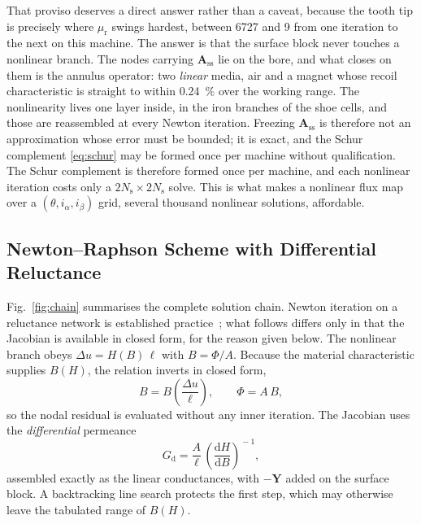 \documentclass[10pt,a4paper,twocolumn]{article}
\theoremstyle{plain}
\theoremstyle{remark}
\begin{document}
That proviso deserves a direct answer rather than a caveat, because the
tooth tip is precisely where $\mu_{\mathrm{r}}$ swings hardest, between
\num{6727} and \num{9} from one iteration to the next on this machine.
The answer is that the surface block never touches a nonlinear branch.
The nodes carrying $\bm{A}_{\mathrm{ss}}$ lie on the bore, and what
closes on them is the annulus operator: two \emph{linear} media, air and
a magnet whose recoil characteristic is straight to within
\SI{0.24}{\percent} over the working range. The nonlinearity lives one
layer inside, in the iron branches of the shoe cells, and those are
reassembled at every Newton iteration. Freezing $\bm{A}_{\mathrm{ss}}$
is therefore not an approximation whose error must be bounded; it is
exact, and the Schur complement \eqref{eq:schur} may be formed once per
machine without qualification. The Schur
complement is therefore formed once per machine, and each nonlinear
iteration costs only a $2N_{\mathrm{s}}\times 2N_{\mathrm{s}}$ solve.
This is what makes a nonlinear flux map over a
$(\theta,i_\alpha,i_\beta)$ grid, several thousand nonlinear
solutions, affordable.

\subsection{Newton--Raphson Scheme with Differential Reluctance}
\label{sub:newton}

Fig.~\ref{fig:chain} summarises the complete solution chain. Newton
iteration on a reluctance network is established
practice~\cite{tavana2016}; what follows differs only in that the
Jacobian is available in closed form, for the reason given below. The
nonlinear branch obeys $\Delta u = H(B)\,\ell$ with $B=\Phi/A$. Because
the material characteristic supplies $B(H)$, the relation inverts in
closed form,
\begin{equation}
B = B\!\left(\frac{\Delta u}{\ell}\right),
\qquad
\Phi = A\,B ,
\label{eq:branch_inv}
\end{equation}
so the nodal residual is evaluated without any inner iteration. The
Jacobian uses the \emph{differential} permeance
\begin{equation}
G_{\mathrm{d}} = \frac{A}{\ell}\,\left(\frac{\mathrm{d}H}{\mathrm{d}B}
\right)^{\!-1} ,
\label{eq:Gdiff}
\end{equation}
assembled exactly as the linear conductances, with $-\bm{Y}$ added on
the surface block. A backtracking line search protects the first step,
which may otherwise leave the tabulated range of $B(H)$.
\end{document}
